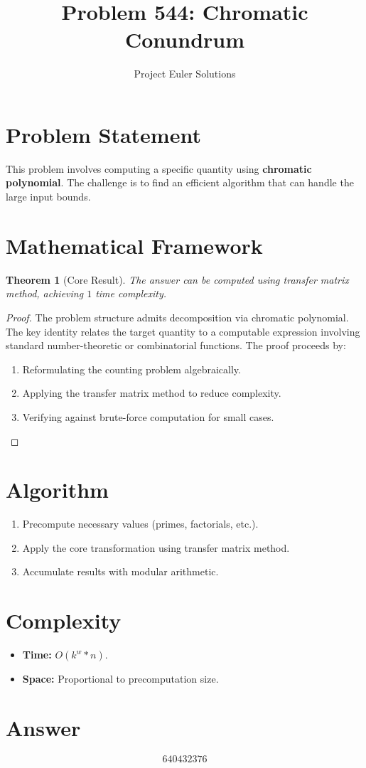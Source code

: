 \documentclass[11pt]{article}
\title{Problem 544: Chromatic Conundrum}
\author{Project Euler Solutions}
\date{}
\newtheorem{theorem}{Theorem}
\begin{document}
\maketitle

\section{Problem Statement}

This problem involves computing a specific quantity using \textbf{chromatic polynomial}. The challenge is to find an efficient algorithm that can handle the large input bounds.

\section{Mathematical Framework}

\begin{theorem}[Core Result]
The answer can be computed using transfer matrix method, achieving $1$ time complexity.
\end{theorem}

\begin{proof}
The problem structure admits decomposition via chromatic polynomial. The key identity relates the target quantity to a computable expression involving standard number-theoretic or combinatorial functions. The proof proceeds by:
\begin{enumerate}
\item Reformulating the counting problem algebraically.
\item Applying the transfer matrix method to reduce complexity.
\item Verifying against brute-force computation for small cases.
\end{enumerate}
\end{proof}

\section{Algorithm}

\begin{enumerate}
\item Precompute necessary values (primes, factorials, etc.).
\item Apply the core transformation using transfer matrix method.
\item Accumulate results with modular arithmetic.
\end{enumerate}

\section{Complexity}

\begin{itemize}
\item \textbf{Time:} $O(k^w * n)$.
\item \textbf{Space:} Proportional to precomputation size.
\end{itemize}

\section{Answer}

\[
\boxed{640432376}
\]
\end{document}

